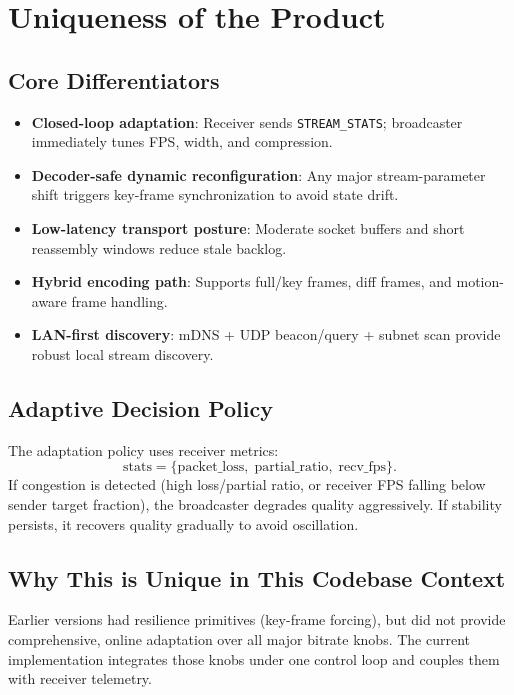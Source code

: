 \documentclass[12pt,a4paper]{article}
\begin{document}
\newpage

\section{Uniqueness of the Product}

\subsection{Core Differentiators}
\begin{itemize}[leftmargin=*, itemsep=4pt]
  \item \textbf{Closed-loop adaptation}: Receiver sends \texttt{STREAM\_STATS}; broadcaster immediately tunes FPS, width, and compression.
  \item \textbf{Decoder-safe dynamic reconfiguration}: Any major stream-parameter shift triggers key-frame synchronization to avoid state drift.
  \item \textbf{Low-latency transport posture}: Moderate socket buffers and short reassembly windows reduce stale backlog.
  \item \textbf{Hybrid encoding path}: Supports full/key frames, diff frames, and motion-aware frame handling.
  \item \textbf{LAN-first discovery}: mDNS + UDP beacon/query + subnet scan provide robust local stream discovery.
\end{itemize}

\subsection{Adaptive Decision Policy}
The adaptation policy uses receiver metrics:
\[
\text{stats} = \{\text{packet\_loss},\;\text{partial\_ratio},\;\text{recv\_fps}\}.
\]
If congestion is detected (high loss/partial ratio, or receiver FPS falling below sender target fraction), the broadcaster degrades quality aggressively. If stability persists, it recovers quality gradually to avoid oscillation.

\subsection{Why This is Unique in This Codebase Context}
Earlier versions had resilience primitives (key-frame forcing), but did not provide comprehensive, online adaptation over all major bitrate knobs. The current implementation integrates those knobs under one control loop and couples them with receiver telemetry.
\end{document}
